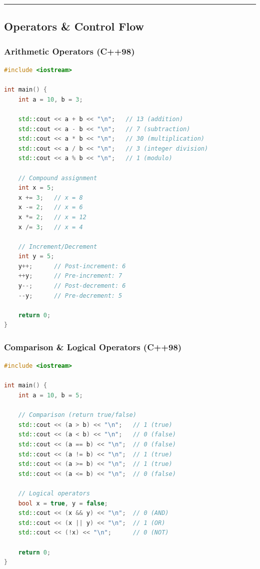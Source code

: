 \begin{center}\rule{0.5\linewidth}{0.5pt}\end{center}

\hypertarget{operators-control-flow}{%
\subsection{Operators \& Control Flow}\label{operators-control-flow}}

\hypertarget{arithmetic-operators-c98}{%
\subsubsection{Arithmetic Operators
(C++98)}\label{arithmetic-operators-c98}}

\begin{lstlisting}[language={C++}]
#include <iostream>

int main() {
    int a = 10, b = 3;

    std::cout << a + b << "\n";   // 13 (addition)
    std::cout << a - b << "\n";   // 7 (subtraction)
    std::cout << a * b << "\n";   // 30 (multiplication)
    std::cout << a / b << "\n";   // 3 (integer division)
    std::cout << a % b << "\n";   // 1 (modulo)

    // Compound assignment
    int x = 5;
    x += 3;   // x = 8
    x -= 2;   // x = 6
    x *= 2;   // x = 12
    x /= 3;   // x = 4

    // Increment/Decrement
    int y = 5;
    y++;      // Post-increment: 6
    ++y;      // Pre-increment: 7
    y--;      // Post-decrement: 6
    --y;      // Pre-decrement: 5

    return 0;
}
\end{lstlisting}

\hypertarget{comparison-logical-operators-c98}{%
\subsubsection{Comparison \& Logical Operators
(C++98)}\label{comparison-logical-operators-c98}}

\begin{lstlisting}[language={C++}]
#include <iostream>

int main() {
    int a = 10, b = 5;

    // Comparison (return true/false)
    std::cout << (a > b) << "\n";   // 1 (true)
    std::cout << (a < b) << "\n";   // 0 (false)
    std::cout << (a == b) << "\n";  // 0 (false)
    std::cout << (a != b) << "\n";  // 1 (true)
    std::cout << (a >= b) << "\n";  // 1 (true)
    std::cout << (a <= b) << "\n";  // 0 (false)

    // Logical operators
    bool x = true, y = false;
    std::cout << (x && y) << "\n";  // 0 (AND)
    std::cout << (x || y) << "\n";  // 1 (OR)
    std::cout << (!x) << "\n";      // 0 (NOT)

    return 0;
}
\end{lstlisting}

